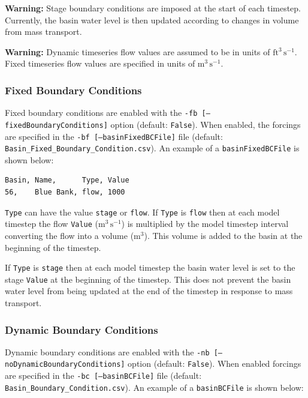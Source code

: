 {\bf Warning:} Stage boundary conditions are imposed at the start of each timestep. Currently, the basin water level is then updated according to changes in volume from mass transport. 

{\bf Warning:} Dynamic timeseries flow values are assumed to be in units of $\mathrm{ft^3\,s^{-1}}$.  Fixed timeseries flow values are specified in units of $\mathrm{m^3\,s^{-1}}$.

\subsubsection{Fixed Boundary Conditions}
\label{sec:Fixed Boundary Conditions}
Fixed boundary conditions are enabled with the \texttt{-fb [--fixedBoundaryConditions]} option (default: \texttt{False}).  When enabled, the forcings are specified in the \texttt{-bf [--basinFixedBCFile]} file (default: \texttt{Basin\_Fixed\_Boundary\_Condition.csv}).  An example of a \texttt{basinFixedBCFile} is shown below:

\begin{verbatim}
Basin, Name,      Type, Value
56,    Blue Bank, flow, 1000
\end{verbatim}

\texttt{Type} can have the value \texttt{stage} or \texttt{flow}. If \texttt{Type} is \texttt{flow} then at each model timestep the flow \texttt{Value} ($\mathrm{m^3\,s^{-1}}$) is multiplied by the model timestep interval converting the flow into a volume ($\mathrm{m^3}$).  This volume is added to the basin at the beginning of the timestep. 

If \texttt{Type} is \texttt{stage} then at each model timestep the basin water level is set to the stage \texttt{Value} at the beginning of the timestep.  This does not prevent the basin water level from being updated at the end of the timestep in response to mass transport. 

\subsubsection{Dynamic Boundary Conditions}
\label{sec:Dynamic Boundary Conditions}
Dynamic boundary conditions are enabled with the \texttt{-nb [--noDynamicBoundaryConditions]} option (default: \texttt{False}).  When enabled forcings are specified in the \texttt{-bc [--basinBCFile]} file (default: \texttt{Basin\_Boundary\_Condition.csv}). An example of a \texttt{basinBCFile} is shown below:

